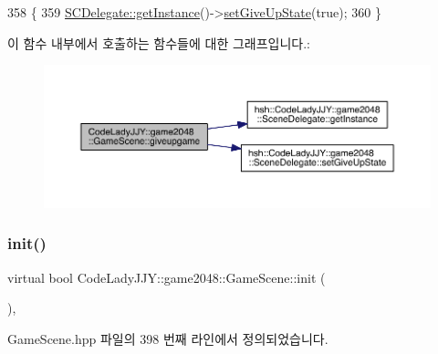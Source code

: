 \begin{DoxyCode}
358                      \{
359         \hyperlink{classhsh_1_1_code_lady_j_j_y_1_1game2048_1_1_scene_delegate_a332a574da455fb687b5d283399a6976c}{SCDelegate::getInstance}()->\hyperlink{classhsh_1_1_code_lady_j_j_y_1_1game2048_1_1_scene_delegate_a26d362200e9644c85f892e71592eef92}{setGiveUpState}(\textcolor{keyword}{true});
360     \}
\end{DoxyCode}
이 함수 내부에서 호출하는 함수들에 대한 그래프입니다.\+:
\nopagebreak
\begin{figure}[H]
\begin{center}
\leavevmode
\includegraphics[width=350pt]{d1/d76/class_code_lady_j_j_y_1_1game2048_1_1_game_scene_a555636f47220602c6b2b25f6594b9dd0_cgraph}
\end{center}
\end{figure}
\mbox{\label{class_code_lady_j_j_y_1_1game2048_1_1_game_scene_ab0ccbc102ba9ceca94daddc2e8f253ba}} 
\subsubsection{\texorpdfstring{init()}{init()}}
{\footnotesize\ttfamily virtual bool Code\+Lady\+J\+J\+Y\+::game2048\+::\+Game\+Scene\+::init (\begin{DoxyParamCaption}{ }\end{DoxyParamCaption})\hspace{0.3cm}{\ttfamily [inline]}, {\ttfamily [virtual]}}



Game\+Scene.\+hpp 파일의 398 번째 라인에서 정의되었습니다.



